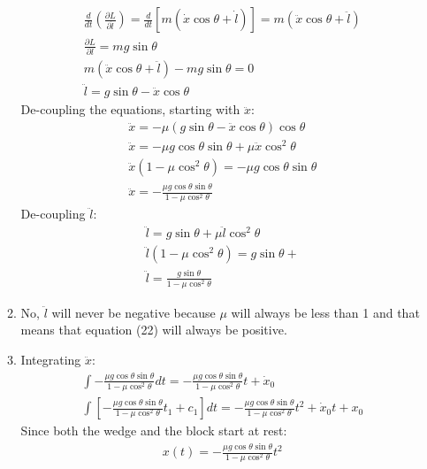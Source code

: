 \documentclass[12pt]{article}
\newcommand{\p}[2]{\frac{\partial #1}{\partial #2}}
\newcommand{\der}[2]{\frac{d #1}{d #2}}
\begin{document}
\begin{enumerate}
\begin{enumerate}
\begin{gather}
                \der{}{t}\left(\p{L}{\dot{l}}\right)=\der{}{t}\left[m(\dot{x}\cos\theta+\dot{l})\right]=m(\ddot{x}\cos\theta+\ddot{l})\\
                \p{L}{l}=mg\sin\theta\\
                m(\ddot{x}\cos\theta+\ddot{l})-mg\sin\theta=0\\
                \ddot{l}=g\sin\theta-\ddot{x}\cos\theta
            \end{gather}
            De-coupling the equations, starting with $\ddot{x}$:
            \begin{gather}
                \ddot{x}=-\mu\left(g\sin\theta-\ddot{x}\cos\theta\right)\cos\theta\\
                \ddot{x}=-\mu g\cos\theta\sin\theta+\mu\ddot{x}\cos^2\theta\\
                \ddot{x}\left( 1-\mu\cos^2\theta \right)=-\mu g\cos\theta\sin\theta\\
                \ddot{x}=-\frac{\mu g\cos\theta\sin\theta}{ 1-\mu\cos^2\theta}
            \end{gather}
            De-coupling $\ddot{l}$:
            \begin{gather}
                \ddot{l}=g\sin\theta+\mu\ddot{l}\cos^2\theta\\
                \ddot{l}\left(1-\mu\cos^2\theta\right)=g\sin\theta+\\
                \ddot{l}=\frac{g\sin\theta}{1-\mu\cos^2\theta}
            \end{gather}
            \item No, $\ddot{l}$ will never be negative because $\mu$ will always be less than 1 and that means that equation (22) will always be positive.
            \item
            Integrating $\ddot{x}$:
            \begin{gather}
                \int-\frac{\mu g\cos\theta\sin\theta}{ 1-\mu\cos^2\theta}dt=-\frac{\mu g\cos\theta\sin\theta}{ 1-\mu\cos^2\theta}t+\dot{x}_0\\
                \int\left[-\frac{\mu g\cos\theta\sin\theta}{ 1-\mu\cos^2\theta}t_1+c_1\right]dt=-\frac{\mu g\cos\theta\sin\theta}{ 1-\mu\cos^2\theta}t^2+\dot{x}_0 t+x_0
            \end{gather}
            Since both the wedge and the block start at rest:
            \begin{gather}
                x(t)=-\frac{\mu g\cos\theta\sin\theta}{ 1-\mu\cos^2\theta}t^2
            \end{gather}

\end{enumerate}
\end{enumerate}
\end{document}
